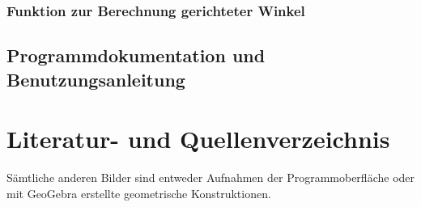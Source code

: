 \documentclass[reducespace,stylepage,semiarbeit]{spezidoc}
\begin{document}
\subsubsection*{Funktion zur Berechnung gerichteter Winkel}

\subsection{Programmdokumentation und Benutzungsanleitung}

\newpage
\nocite{*}
\section{Literatur- und Quellenverzeichnis}
\printbibliography[type=online, title=Internetquellen]
\printbibliography[type=book, title=Buchquellen]
\printbibliography[type=misc, title=Bildquellen]
Sämtliche anderen Bilder sind entweder Aufnahmen der Programmoberfläche oder mit GeoGebra erstellte geometrische Konstruktionen.

\eidesstattlicheerklaerung
\end{document}
